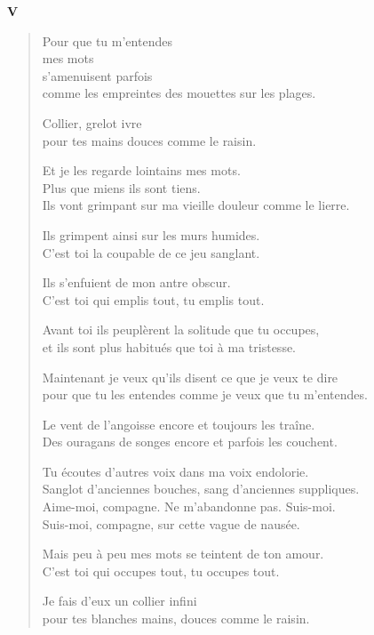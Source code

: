 \documentclass[11pt,a4paper]{book}
\begin{document}
\newpage


\begin{center} \textbf{V} \end{center}

\bigskip

\begin{verse}
  Pour que tu m'entendes \\
  mes mots \\
  s'amenuisent parfois \\
  comme les empreintes des mouettes sur les plages.

  Collier, grelot ivre \\
  pour tes mains douces comme le raisin.

  Et je les regarde lointains mes mots. \\
  Plus que miens ils sont tiens. \\
  Ils vont grimpant sur ma vieille douleur comme le lierre.

  Ils grimpent ainsi sur les murs humides. \\
  C'est toi la coupable de ce jeu sanglant.

  Ils s'enfuient de mon antre obscur. \\
  C'est toi qui emplis tout, tu emplis tout.

  Avant toi ils peuplèrent la solitude que tu occupes, \\
  et ils sont plus habitués que toi à ma tristesse.

  Maintenant je veux qu'ils disent ce que je veux te dire \\
  pour que tu les entendes comme je veux que tu m'entendes.

  Le vent de l'angoisse encore et toujours les traîne. \\
  Des ouragans de songes encore et parfois les couchent.

  Tu écoutes d'autres voix dans ma voix endolorie. \\
  Sanglot d'anciennes bouches, sang d'anciennes suppliques. \\
  Aime-moi, compagne. Ne m'abandonne pas. Suis-moi. \\
  Suis-moi, compagne, sur cette vague de nausée.

  Mais peu à peu mes mots se teintent de ton amour. \\
  C'est toi qui occupes tout, tu occupes tout.

  Je fais d'eux un collier infini \\
  pour tes blanches mains, douces comme le raisin.
\end{verse}
\end{document}
